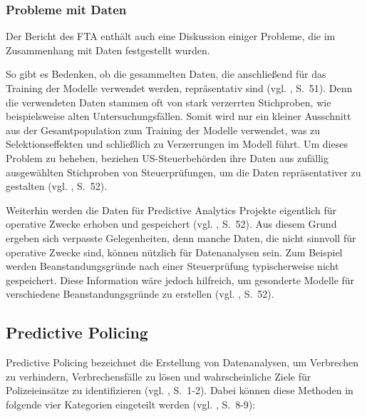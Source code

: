 \subsubsection{Probleme mit Daten}

Der Bericht des FTA enthält auch eine Diskussion einiger Probleme, die im Zusammenhang mit Daten
festgestellt wurden.

So gibt es Bedenken, ob die gesammelten Daten, die anschließend für das Training der Modelle verwendet werden,
repräsentativ sind (vgl. \cite{OECD}, S.~51). Denn die verwendeten Daten stammen oft von stark verzerrten
Stichproben, wie beispielsweise alten Untersuchungsfällen. Somit wird nur ein kleiner Ausschnitt aus der
Gesamtpopulation zum Training der Modelle verwendet, was zu Selektionseffekten und schließlich zu Verzerrungen
im Modell führt. Um dieses Problem zu beheben, beziehen US-Steuerbehörden ihre Daten aus zufällig ausgewählten
Stichproben von Steuerprüfungen, um die Daten repräsentativer zu gestalten (vgl. \cite{OECD}, S.~52).

Weiterhin werden die Daten für Predictive Analytics Projekte eigentlich für operative Zwecke erhoben und
gespeichert (vgl. \cite{OECD}, S.~52). Aus diesem Grund ergeben sich verpasste Gelegenheiten, denn manche Daten, die nicht sinnvoll
für operative Zwecke sind, können nützlich für Datenanalysen sein. Zum Beispiel werden Beanstandungsgründe nach
einer Steuerprüfung typischerweise nicht gespeichert. Diese Information wäre jedoch hilfreich, um gesonderte Modelle
für verschiedene Beanstandungsgründe zu erstellen (vgl. \cite{OECD}, S.~52). 

\subsection{Predictive Policing}

Predictive Policing bezeichnet die Erstellung von Datenanalysen, um Verbrechen zu verhindern, Verbrechensfälle zu lösen
und wahrscheinliche Ziele für Polizeieinsätze zu identifizieren (vgl. \cite{Perry}, S.~1-2). Dabei können diese Methoden
in folgende vier Kategorien eingeteilt werden (vgl. \cite{Perry}, S.~8-9):

